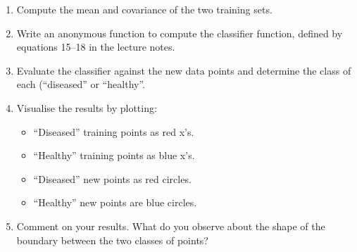 \documentclass[12pt,a4paper]{tufte-handout}
\begin{document}
\begin{enumerate}
  \item Compute the mean and covariance of the two training sets.
  \item Write an anonymous function to compute the classifier function, defined by equations 15--18 in the lecture notes.
  \item Evaluate the classifier against the new data points and determine the class of each (``diseased'' or ``healthy''.
  \item Visualise the results by plotting:
    \begin{itemize}
    \item ``Diseased'' training points as red x's.
    \item ``Healthy'' training points as blue x's.
    \item ``Diseased'' new points as red circles.
    \item ``Healthy'' new points are blue circles.
    \end{itemize}
  \item Comment on your results. What do you observe about the shape of the boundary between the two classes of points?
\end{enumerate}
\end{document}
